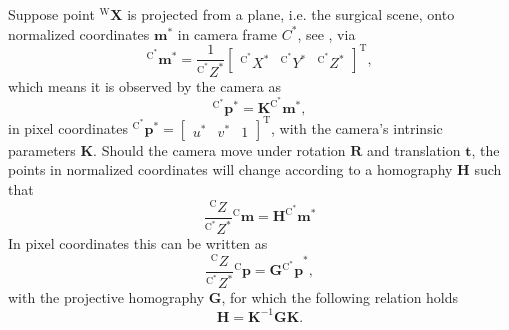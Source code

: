 Suppose point $^\text{W}\mathbf{X}$ is projected from a plane, i.e. the surgical scene, onto normalized coordinates $\mathbf{m}^*$ in camera frame $C^*$, see , via
\begin{equation}
    ^{\text{C}^*}\mathbf{m}^* = \frac{1}{^{\text{C}^*}Z^*}\begin{bmatrix}^{\text{C}^*}X^*&^{\text{C}^*}Y^*&^{\text{C}^*}Z^*\end{bmatrix}^\text{T},
\end{equation}
which means it is observed by the camera as
\begin{equation}
    ^{\text{C}^*}\mathbf{p}^* = \mathbf{K}^{\text{C}^*}\mathbf{m}^*,
\end{equation}
in pixel coordinates $^{\text{C}^*}\mathbf{p}^*=\begin{bmatrix}u^*&v^*&1\end{bmatrix}^\text{T}$, with the camera's intrinsic parameters $\mathbf{K}$. Should the camera move under rotation $\mathbf{R}$ and translation $\mathbf{t}$, the points in normalized coordinates will change according to a homography $\mathbf{H}$ such that~\cite{benhimane2006homography}
\begin{equation}
    \frac{^{\text{C}}Z}{^{\text{C}^*}Z^*}{^{\text{C}}\mathbf{m}} = \mathbf{H}^{\text{C}^*}\mathbf{m}^*
\end{equation}
In pixel coordinates this can be written as
\begin{equation}
    \frac{^{\text{C}}Z}{^{\text{C}^*}Z^*}{^{\text{C}}\mathbf{p}} = \mathbf{G}{^{\text{C}^*}\mathbf{p}}^*,
\end{equation}
with the projective homography $\mathbf{G}$, for which the following relation holds
\begin{equation}
    \mathbf{H} = \mathbf{K}^{-1}\mathbf{G}\mathbf{K}.
    \label{c2:eq:h_norm}
\end{equation}

